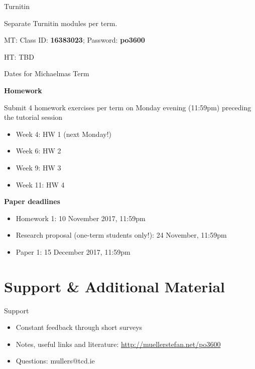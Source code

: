 \documentclass[10pt]{beamer}
\begin{document}
\begin{frame}{Turnitin}

Separate Turnitin modules per term.

MT: Class ID: \textbf{16383023}; Password: \textbf{po3600}

HT: TBD

\end{frame}

\begin{frame}{Dates for Michaelmas Term}

\textbf{Homework}

Submit 4 homework exercises per term on Monday evening (11:59pm) preceding the tutorial session

\begin{itemize}
\item Week 4: HW 1 (next Monday!)
\item Week 6: HW 2
\item Week 9: HW 3
\item Week 11: HW 4
\end{itemize}

\textbf{Paper deadlines}

\begin{itemize}
\item Homework 1: 10 November 2017, 11:59pm
\item Research proposal (one-term students only!): 24 November, 11:59pm
\item Paper 1: 15 December 2017, 11:59pm
\end{itemize}


\end{frame}

\section{Support \& Additional Material}

\begin{frame}{Support}

\begin{itemize}
\item Constant feedback through short surveys%
\item Notes, useful links and literature: \url{http://muellerstefan.net/po3600}
\item Questions: mullers@tcd.ie
\end{itemize}

\end{frame}
\end{document}
